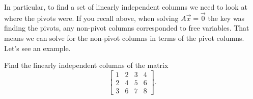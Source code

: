 \documentclass{ximera}
\begin{document}
In particular, to find a set of linearly independent columns we need to look at where the pivots were.  If you recall above, when solving $A \vec{x} = \vec{0}$ the key was finding the pivots, any non-pivot columns corresponded to free variables.  That means we can solve for the non-pivot columns in terms of the pivot columns.  Let's see an example. 
\begin{example}
    Find the linearly independent columns of the matrix
    \begin{equation*}
        \begin{bmatrix}
            1 & 2 & 3 & 4 \\
            2 & 4 & 5 & 6 \\
            3 & 6 & 7 & 8
        \end{bmatrix} .
    \end{equation*}
\end{example}
\end{document}
